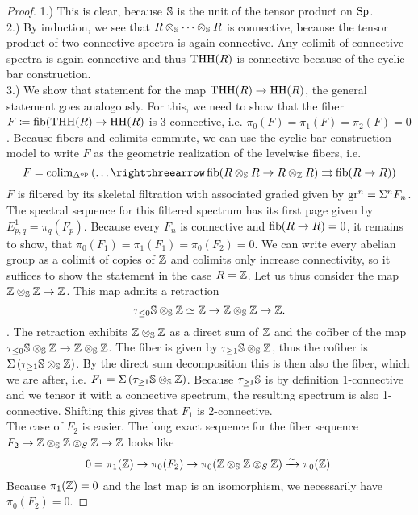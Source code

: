 \begin{proof}
    1.) This is clear, because $\S$ is the unit of the tensor product on $\Sp$. \\
    2.) By induction, we see that $R\otimes_\S\dots\otimes_\S R$ is connective, because the tensor product of two connective spectra is again connective. Any colimit of connective spectra is again connective and thus $\THH(R)$ is connective because of the cyclic bar construction. \\
    3.) We show that statement for the map $\THH(R)\to \HH(R)$, the general statement goes analogously.
    For this, we need to show that the fiber $F\coloneqq \fib(\THH(R)\to \HH(R)$ is 3-connective, i.e. $\pi_0(F)=\pi_1(F)=\pi_2(F)=0$. Because fibers and colimits commute, we can use the cyclic bar construction model to write $F$ as the geometric realization of the levelwise fibers, i.e.
    \begin{equation*}
        F=\colim_{\Delta^{\op}} \left( \dots\rightthreearrow \fib(R\otimes_\S R\to R\otimes_\Z R) \rightrightarrows \fib(R\to R) \right)
    \end{equation*}
    $F$ is filtered by its skeletal filtration with associated graded given by $\gr^n=\Sigma^n F_n$. The spectral sequence for this filtered spectrum has its first page given by $E^1_{p,q}=\pi_q(F_p)$. Because every $F_n$ is connective and $\fib(R\to R)=0$, it remains to show, that $\pi_0(F_1)=\pi_1(F_1)=\pi_0(F_2)=0$. We can write every abelian group as a colimit of copies of $\Z$ and colimits only increase connectivity, so it suffices to show the statement in the case $R=\Z$. Let us thus consider the map $\Z\otimes_\S \Z\to \Z$. This map admits a retraction 
    \begin{equation*}
        \tau_{\leq 0}\S\otimes_\S\Z\simeq \Z\to \Z\otimes_\S \Z\to \Z.
    \end{equation*}.
    The retraction exhibits $\Z\otimes_\S\Z$ as a direct sum of $\Z$ and the cofiber of the map $\tau_{\leq 0}\S\otimes_\S\Z\to \Z\otimes_\S\Z$. The fiber is given by $\tau_{\geq 1}\S\otimes_\S\Z$, thus the cofiber is $\Sigma\left( \tau_{\geq 1}\S\otimes_\S\Z \right)$. By the direct sum decomposition this is then also the fiber, which we are after, i.e. $F_1=\Sigma\left( \tau_{\geq 1}\S\otimes_\S\Z \right)$. Because $\tau_{\geq 1}\S$ is by definition 1-connective and we tensor it with a connective spectrum, the resulting spectrum is also 1-connective. Shifting this gives that $F_1$ is 2-connective. \\
    The case of $F_2$ is easier. The long exact sequence for the fiber sequence $F_2\to \Z\otimes_\S\Z\otimes_S\Z\to \Z$ looks like 
    \begin{equation*}
        0=\pi_1(\Z)\to \pi_0(F_2)\to \pi_0(\Z\otimes_\S\Z\otimes_S\Z)\rai \pi_0(\Z).
    \end{equation*}
    Because $\pi_1(\Z)=0$ and the last map is an isomorphism, we necessarily have $\pi_0(F_2)=0$. \qedhere
\end{proof}
